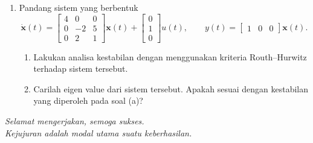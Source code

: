 \documentclass[11pt,a4paper]{article}
\newcommand{\xx}{\mathbf{x}}
\begin{document}
\begin{enumerate}
  \item Pandang sistem yang berbentuk
        \[
          \dot{\xx}(t)=
          \begin{bmatrix}4&0&0\\0&-2&5\\0&2&1\end{bmatrix}\xx(t)
          +\begin{bmatrix}0\\1\\0\end{bmatrix}u(t),
          \qquad
          y(t)=\begin{bmatrix}1&0&0\end{bmatrix}\xx(t).
        \]
        \begin{enumerate}
          \item Lakukan analisa kestabilan dengan menggunakan kriteria Routh--Hurwitz terhadap sistem tersebut.
          \item Carilah eigen value dari sistem tersebut.
                Apakah sesuai dengan kestabilan yang diperoleh pada soal (a)?
        \end{enumerate}
\end{enumerate}

\vfill
\begin{center}
  \textit{Selamat mengerjakan, semoga sukses.}\\
  \textit{Kejujuran adalah modal utama suatu keberhasilan.}
\end{center}
\newpage
\end{document}
